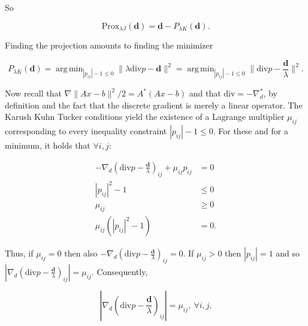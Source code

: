 \documentclass[paper=a4, fontsize=11pt]{scrartcl} %
\DeclareMathOperator*{\argmin}{arg\,min}
\numberwithin{equation}{section} %
\numberwithin{figure}{section} %
\numberwithin{table}{section} %
\newcommand{\data}{\mathbf{d}}
\newcommand{\prox}{\text{Prox}}
\newcommand{\grad}{\nabla_{d} }
\newcommand{\divg}{\text{div}}
\begin{document}
So

\begin{equation}\label{eq:chambolle prox}
  \prox_{\lambda J}(\data) = \data - P_{\lambda K} ( \data ).
\end{equation}



Finding the projection amounts to finding the minimizer

\begin{equation*}
  P_{\lambda K}(\data) = \argmin_{|p_{ij}| - 1 \leq 0} \| \lambda \divg
  p - \data \|^2 = \argmin_{|p_{ij}| - 1 \leq 0} \| \divg p -
  \frac{\data}{\lambda} \|^2.
\end{equation*}

Now recall that $\nabla \|Ax - b \|^2/2 = A^*(Ax-b)$ and that $\divg =
-\grad^{*}$, by definition and the fact that the discrete gradient is
merely a linear operator. The Karush Kuhn Tucker conditions yield the
existence of a Lagrange multiplier $\mu_{ij}$ corresponding to every
inequality constraint $|p_{ij}| - 1 \leq 0$. For these and for a
minimum, it holds that $\forall i,j$:

\begin{align*}
  -\grad \left ( \divg p - \frac{\data}{\lambda} \right )_{ij} +  \mu_{ij} p_{ij} &= 0 \\
  |p_{ij}|^2 - 1 & \leq 0 \\ 
  \mu_{ij} &\geq 0 \\
  \mu_{ij}( |p_{ij}|^2 - 1 ) &= 0.
\end{align*}

Thus, if $\mu_{ij} = 0$ then also $-\grad(  \divg p -\frac{\data}{\lambda} )_{ij} = 0$.
If $\mu_{ij} > 0$ then $|p_{ij}| = 1$ and so $|\grad( \divg p - \frac{\data}{\lambda} )_{ij}| = \mu_{ij}$.
Consequently,

\begin{equation*}
 \left |\grad \left (\divg p - \frac{\data}{\lambda} \right )_{ij} \right | =  \mu_{ij}, \ \forall i,j.
\end{equation*}
\end{document}
